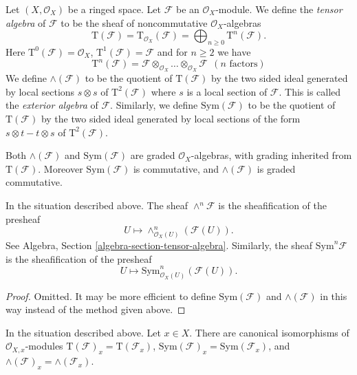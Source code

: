 \noindent
Let $(X, \mathcal{O}_X)$ be a ringed space.
Let $\mathcal{F}$ be an $\mathcal{O}_X$-module.
We define the {\it tensor algebra} of $\mathcal{F}$ to be
the sheaf of noncommutative $\mathcal{O}_X$-algebras
$$
\text{T}(\mathcal{F})
=
\text{T}_{\mathcal{O}_X}(\mathcal{F})
= \bigoplus\nolimits_{n \geq 0} \text{T}^n(\mathcal{F}).
$$
Here $\text{T}^0(\mathcal{F}) = \mathcal{O}_X$,
$\text{T}^1(\mathcal{F}) = \mathcal{F}$
and for $n \geq 2$ we have
$$
\text{T}^n(\mathcal{F}) =
\mathcal{F} \otimes_{\mathcal{O}_X} \ldots \otimes_{\mathcal{O}_X} \mathcal{F}
\ \ (n\text{ factors})
$$
We define $\wedge(\mathcal{F})$ to be the quotient of
$\text{T}(\mathcal{F})$ by the two sided ideal generated by
local sections $s \otimes s$ of $\text{T}^2(\mathcal{F})$ where
$s$ is a local section of $\mathcal{F}$. This is
called the {\it exterior algebra} of $\mathcal{F}$.
Similarly, we define $\text{Sym}(\mathcal{F})$ to be
the quotient of $\text{T}(\mathcal{F})$ by the two
sided ideal generated by local sections of the form
$s \otimes t - t \otimes s$ of $\text{T}^2(\mathcal{F})$.

\medskip\noindent
Both $\wedge(\mathcal{F})$ and $\text{Sym}(\mathcal{F})$ are graded
$\mathcal{O}_X$-algebras, with grading inherited from $\text{T}(\mathcal{F})$.
Moreover $\text{Sym}(\mathcal{F})$
is commutative, and $\wedge(\mathcal{F})$ is graded commutative.

\begin{lemma}
\label{lemma-local-tensor-algebra}
In the situation described above.
The sheaf $\wedge^n\mathcal{F}$ is the sheafification of the
presheaf
$$
U \longmapsto \wedge^n_{\mathcal{O}_X(U)}(\mathcal{F}(U)).
$$
See Algebra, Section \ref{algebra-section-tensor-algebra}.
Similarly, the sheaf $\text{Sym}^n\mathcal{F}$ is the sheafification
of the presheaf
$$
U \longmapsto \text{Sym}^n_{\mathcal{O}_X(U)}(\mathcal{F}(U)).
$$
\end{lemma}

\begin{proof}
Omitted. It may be more efficient to define $\text{Sym}(\mathcal{F})$
and $\wedge(\mathcal{F})$ in this way instead of the method
given above.
\end{proof}

\begin{lemma}
\label{lemma-stalk-tensor-algebra}
In the situation described above. Let $x \in X$.
There are canonical isomorphisms of $\mathcal{O}_{X, x}$-modules
$\text{T}(\mathcal{F})_x = \text{T}(\mathcal{F}_x)$,
$\text{Sym}(\mathcal{F})_x = \text{Sym}(\mathcal{F}_x)$, and
$\wedge(\mathcal{F})_x = \wedge(\mathcal{F}_x)$.
\end{lemma}

